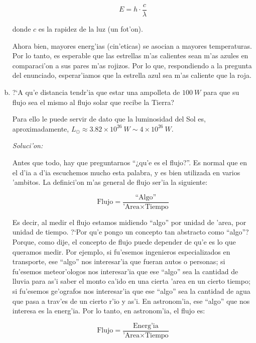 \documentclass{article}
\newenvironment{myfont}{\fontfamily{pnc}\selectfont}{\par}
\begin{document}
\begin{enumerate}[a)]
\begin{equation} \label{energia_nu}
E = h \cdot \frac{c}{\lambda}
\end{equation}

donde $c$ es la rapidez de la luz (un fot'on).

Ahora bien, mayores energ'ias (cin'eticas) se asocian a mayores temperaturas. Por lo tanto, es esperable que las estrellas m'as calientes sean m'as azules en comparaci'on a sus pares m'as rojizos. Por lo que, respondiendo a la pregunta del enunciado, esperar'iamos que la estrella azul sea m'as caliente que la roja.
\begin{myfont}\item ?`A qu'e distancia tendr'ia que estar una ampolleta de $100 \ W$ para que su flujo sea el mismo al flujo solar que recibe la Tierra? 

Para ello le puede servir de dato que la luminosidad del Sol es, aproximadamente, $L_\odot \approx 3.82 \times 10^{26} \ W \sim 4 \times 10^{26} \ W$.\end{myfont}

\emph{Soluci'on:}

Antes que todo, hay que preguntarnos ``¿qu'e es el flujo?''. Es normal que en el d'ia a d'ia escuchemos mucho esta palabra, y es bien utilizada en varios 'ambitos. La definici'on m'as general de flujo ser'ia la siguiente:

\begin{equation}
\text{Flujo} = \frac{\text{``Algo''}}{\text{'Area} \times \text{Tiempo}}
\end{equation}

Es decir, al medir el flujo estamos midiendo ``algo'' por unidad de 'area, por unidad de tiempo. ?`Por qu'e pongo un concepto tan abstracto como ``algo''? Porque, como dije, el concepto de flujo puede depender de qu'e es lo que queramos medir. Por ejemplo, si fu'esemos ingenieros especializados en transporte, ese ``algo'' nos interesar'ia que fueran autos o personas; si fu'esemos meteor'ologos nos interesar'ia que ese ``algo'' sea la cantidad de lluvia para as'i saber el monto ca'ido en una cierta 'area en un cierto tiempo; si fu'esemos ge'ografos nos interesar'ia que ese ``algo'' sea la cantidad de agua que pasa a trav'es de un cierto r'io y as'i. En astronom'ia, ese ``algo'' que nos interesa es la energ'ia. Por lo tanto, en astronom'ia, el flujo es:

\begin{equation} \label{flujo}
\text{Flujo} = \frac{\text{Energ'ia}}{\text{'Area} \times \text{Tiempo}}
\end{equation}


\end{enumerate}
\end{document}
